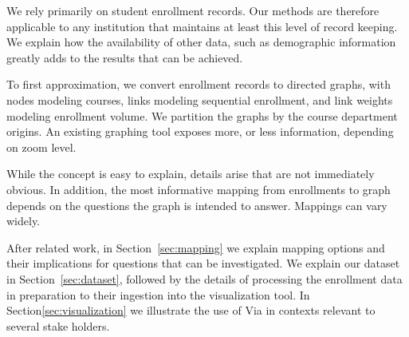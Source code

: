 We rely primarily on student enrollment records. Our methods are
therefore applicable to any institution that maintains at least this
level of record keeping. We explain how the availability of other
data, such as demographic information greatly adds to the results that
can be achieved.

To first approximation, we convert enrollment records to directed
graphs, with nodes modeling courses, links modeling sequential
enrollment, and link weights modeling enrollment volume. We partition
the graphs by the course department origins. An existing graphing tool
\cite{shannon2003cytoscape} exposes more, or less information,
depending on zoom level.

While the concept is easy to explain, details arise that are not
immediately obvious. In addition, the most informative mapping from
enrollments to graph depends on the questions the graph is intended to
answer. Mappings can vary widely.

After related work, in Section~\ref{sec:mapping} we explain mapping
options and their implications for questions that can be
investigated. We explain our dataset in Section~\ref{sec:dataset},
followed by the details of processing the enrollment data in
preparation to their ingestion into the visualization tool. In
Section\ref{sec:visualization} we illustrate the use of Via in
contexts relevant to several stake holders.

